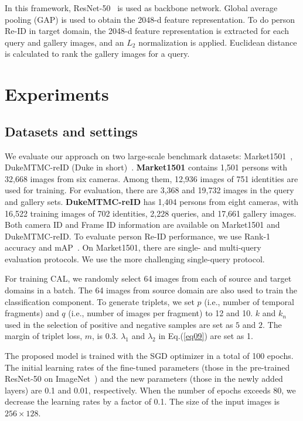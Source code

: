 \documentclass[10pt,twocolumn,letterpaper]{article}
\begin{document}
In this framework, ResNet-50~\cite{DBLP:conf/cvpr/HeZRS16} is used as backbone network. Global average pooling (GAP) is used to obtain the 2048-d feature representation. To do person Re-ID in target domain, the 2048-d feature representation is extracted for each query and gallery images, and an $L_{2}$ normalization is applied. Euclidean distance is calculated to rank the gallery images for a query. 

 
 
 
\section{Experiments}
\subsection{Datasets and settings}\label{sec:EXP-DS}
We evaluate our approach on two large-scale benchmark datasets: Market1501~\cite{DBLP:conf/iccv/ZhengSTWWT15}, DukeMTMC-reID (Duke in short)~\cite{DBLP:conf/iccv/ZhengZY17}.
 \textbf{Market1501} contains 1,501 persons with 32,668 images from six cameras. Among them, 12,936 images of 751 identities are used for training. For evaluation, there are 3,368 and 19,732 images in the query and gallery sets. \textbf{DukeMTMC-reID} has 1,404 persons from eight cameras, with 16,522 training images of 702 identities, 2,228 queries, and 17,661 gallery images. Both camera ID and Frame ID information are available on Market1501 and DukeMTMC-reID. To evaluate person Re-ID performance, we use Rank-1 accuracy and mAP~\cite{DBLP:conf/iccv/ZhengSTWWT15}. On Market1501, there are single- and multi-query evaluation protocols. We use the more challenging single-query protocol.
 
For training CAL, we randomly select 64 images from each of source and target domains in a batch. The 64 images from source domain are also used to train the classification component. To generate triplets, we set $p$ (i.e., number of temporal fragments) and $q$ (i.e., number of images per fragment) to 12 and 10. $k$ and $k_{n}$ used in the selection of positive and negative samples are set as $5$ and $2$. The margin of triplet loss, $m$, is 0.3. $\lambda_{1}$ and $\lambda_{2}$ in Eq.(\ref{eq09}) are set as 1. 
 
The proposed model is trained with the SGD optimizer in a total of 100 epochs. The initial learning rates of the fine-tuned parameters (those in the pre-trained ResNet-50 on ImageNet~\cite{DBLP:conf/cvpr/DengDSLL009}) and the new parameters (those in the newly added layers) are 0.1 and 0.01, respectively. When the number of epochs exceeds 80, we decrease the learning rates by a factor of 0.1. The size of the input images is $256 \times 128$. 
\end{document}
